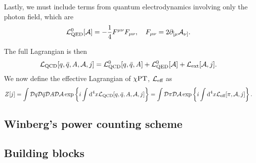 
Lastly, we must include terms from quantum electrodynamics involving only the photon field, which are
%
\begin{equation}
    \mathcal{L}^0_\text{QED}[\mathcal A] 
    = -\frac{1}{4} F^{\mu \nu}F_{\mu \nu}, \quad
    F_{\mu \nu} = 2 \partial_{[\mu}\mathcal A_{\nu]}.
\end{equation}
 

The full Lagrangian is then
%
\begin{equation}
    \mathcal{L}_\text{QCD}[q, \bar q, A,\mathcal A, j] = \mathcal{L}_\text{QCD}^0[q, \bar q, A] + \mathcal{L}^0_\text{QED}[\mathcal A] + \mathcal{L}_\text{ext}[\mathcal A, j].
\end{equation}
%
We now define the effective Lagrangian of $\chi \text{PT}$, $\mathcal{L}_\text{eff}$ as
%
\begin{equation}
    \label{definition effective lagrangian chpt}
    Z[j]
    = 
    \int \mathcal D q \mathcal D \bar q \mathcal D A \mathcal D \mathcal A\,
    \text{exp} \left\{ i\int \text{d}^4 x \mathcal{L}_\text{QCD}[q, \bar q, A, \mathcal A, j]  \right\}
    = 
    \int \mathcal D \pi \mathcal D \mathcal A\,
    \text{exp} \left\{ i\int \text{d}^4 x \mathcal{L}_\text{eff}[\pi, \mathcal{A}, j]  \right\}.
\end{equation}


\subsection{Winberg's power counting scheme}
\label{subsection: Weinberg's power counting scheme}



\subsection{Building blocks}

